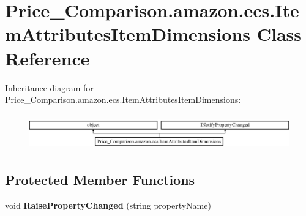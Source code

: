 \hypertarget{class_price___comparison_1_1amazon_1_1ecs_1_1_item_attributes_item_dimensions}{\section{Price\-\_\-\-Comparison.\-amazon.\-ecs.\-Item\-Attributes\-Item\-Dimensions Class Reference}
\label{class_price___comparison_1_1amazon_1_1ecs_1_1_item_attributes_item_dimensions}
}


 


Inheritance diagram for Price\-\_\-\-Comparison.\-amazon.\-ecs.\-Item\-Attributes\-Item\-Dimensions\-:\begin{figure}[H]
\begin{center}
\leavevmode
\includegraphics[height=1.555556cm]{class_price___comparison_1_1amazon_1_1ecs_1_1_item_attributes_item_dimensions}
\end{center}
\end{figure}
\subsection*{Protected Member Functions}
\begin{DoxyCompactItemize}
\item 
\hypertarget{class_price___comparison_1_1amazon_1_1ecs_1_1_item_attributes_item_dimensions_ad99ed4de7f19e3439efc7ff18792e73a}{void {\bfseries Raise\-Property\-Changed} (string property\-Name)}\label{class_price___comparison_1_1amazon_1_1ecs_1_1_item_attributes_item_dimensions_ad99ed4de7f19e3439efc7ff18792e73a}

\end{DoxyCompactItemize}
